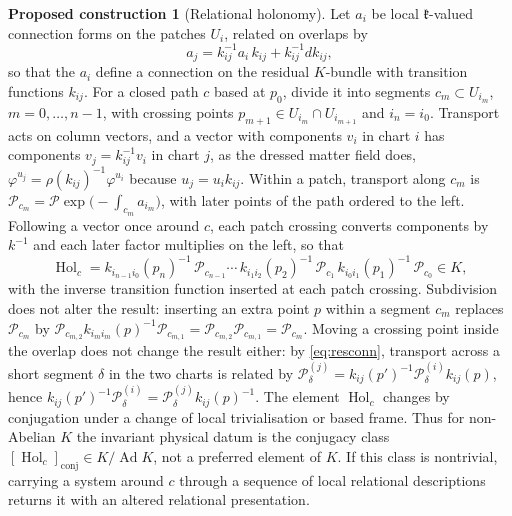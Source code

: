 \documentclass[11pt]{article}
\theoremstyle{plain}
\theoremstyle{definition}
\newtheorem{construction}{Proposed construction}
\theoremstyle{remark}
\newcommand{\Hol}{\operatorname{Hol}}
\begin{document}
\begin{construction}[Relational holonomy]\label{con:hol}
Let $a_i$ be local $\mathfrak k$-valued connection forms on the patches $U_i$, related on overlaps by
\begin{equation}\label{eq:resconn}
a_j=k_{ij}^{-1}a_i\,k_{ij}+k_{ij}^{-1}dk_{ij},
\end{equation}
so that the $a_i$ define a connection on the residual $K$-bundle with transition functions $k_{ij}$. For a closed path $c$ based at $p_0$, divide it into segments $c_m\subset U_{i_m}$, $m=0,\dots,n-1$, with crossing points $p_{m+1}\in U_{i_m}\cap U_{i_{m+1}}$ and $i_n=i_0$. Transport acts on column vectors, and a vector with components $v_i$ in chart $i$ has components $v_j=k_{ij}^{-1}v_i$ in chart $j$, as the dressed matter field does, $\varphi^{u_j}=\rho(k_{ij})^{-1}\varphi^{u_i}$ because $u_j=u_ik_{ij}$. Within a patch, transport along $c_m$ is $\mathcal P_{c_m}=\mathcal P\exp\!\big(-\!\int_{c_m}a_{i_m}\big)$, with later points of the path ordered to the left. Following a vector once around $c$, each patch crossing converts components by $k^{-1}$ and each later factor multiplies on the left, so that
\begin{equation}
\Hol_c=k_{i_{n-1}i_0}(p_n)^{-1}\,\mathcal P_{c_{n-1}}\cdots\,k_{i_1i_2}(p_2)^{-1}\,\mathcal P_{c_1}\,k_{i_0i_1}(p_1)^{-1}\,\mathcal P_{c_0}\in K ,
\end{equation}
with the inverse transition function inserted at each patch crossing. Subdivision does not alter the result: inserting an extra point $p$ within a segment $c_m$ replaces $\mathcal P_{c_m}$ by $\mathcal P_{c_{m,2}}k_{i_mi_m}(p)^{-1}\mathcal P_{c_{m,1}}=\mathcal P_{c_{m,2}}\mathcal P_{c_{m,1}}=\mathcal P_{c_m}$. Moving a crossing point inside the overlap does not change the result either: by \eqref{eq:resconn}, transport across a short segment $\delta$ in the two charts is related by $\mathcal P^{(j)}_\delta=k_{ij}(p')^{-1}\mathcal P^{(i)}_\delta k_{ij}(p)$, hence $k_{ij}(p')^{-1}\mathcal P^{(i)}_\delta=\mathcal P^{(j)}_\delta k_{ij}(p)^{-1}$. The element $\Hol_c$ changes by conjugation under a change of local trivialisation or based frame. Thus for non-Abelian $K$ the invariant physical datum is the conjugacy class $[\Hol_c]_{\mathrm{conj}}\in K/\!\operatorname{Ad}K$, not a preferred element of $K$. If this class is nontrivial, carrying a system around $c$ through a sequence of local relational descriptions returns it with an altered relational presentation.
\end{construction}
\end{document}
